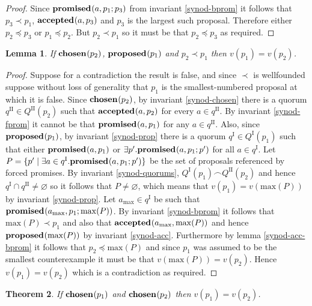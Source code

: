 \documentclass[journal]{IEEEtran}
\newtheorem{theorem}{Theorem}
\newtheorem{lemma}[theorem]{Lemma}
\begin{document}
\begin{proof}Since $\mathbf{promised}_{}(a,p_1;p_3)$ from invariant \ref{synod-bprom} it
follows that $p_3 \prec p_1$, $\mathbf{accepted}_{}(a,p_3)$ and $p_3$ is the largest such
proposal. Therefore either $p_2 \preceq p_3$ or $p_1 \preceq p_2$.  But $p_2
\prec p_1$ so it must be that $p_2 \preceq p_3$ as required.  \end{proof}

\begin{lemma}\label{synod-lemma} If $\mathbf{chosen}_{}(p_2)$, $\mathbf{proposed}_{}(p_1)$ and $p_2
\prec p_1$ then $v(p_1) = v(p_2)$. \end{lemma}

\begin{proof}Suppose for a contradiction the result is false, and since $\prec$
is wellfounded suppose without loss of generality that $p_1$ is the
smallest-numbered proposal at which it is false.  Since $\mathbf{chosen}_{}(p_2)$, by
invariant \ref{synod-chosen} there is a quorum $q^\textrm{II} \in
Q^\textrm{II}(p_2)$ such that $\mathbf{accepted}_{}(a,p_2)$ for every $a \in q^\textrm{II}$.
By invariant \ref{synod-fprom} it cannot be that $\mathbf{promised}_{}(a,p_1)$ for any $a
\in q^\textrm{II}$.  Also, since $\mathbf{proposed}_{}(p_1)$, by invariant \ref{synod-prop}
there is a quorum $q^\textrm{I} \in Q^\textrm{I}(p_1)$ such that either
$\mathbf{promised}_{}(a,p_1)$ or $\exists p'.  \mathbf{promised}_{}(a,p_1;p')$ for all $a \in
q^\textrm{I}$.  Let $P = \{ p' \mid \exists a \in q^\textrm{I}.
\mathbf{promised}_{}(a,p_1;p') \}$ be the set of proposals referenced by forced promises.
By invariant \ref{synod-quorums}, ${Q^\textrm{I}(p_1) \frown
Q^\textrm{II}(p_2)}$ and hence $q^\textrm{I} \cap q^\textrm{II} \ne
\varnothing$ so it follows that $P \ne \varnothing$, which means that $v(p_1) =
v(\mathrm{max}(P))$ by invariant \ref{synod-prop}. Let $a_{\mathrm{max}} \in
q^\textrm{I}$ be such that $\mathbf{promised}_{}(a_{\mathrm{max}},p_1;\mathrm{max}(P))$.
By invariant \ref{synod-bprom} it follows that $\mathrm{max}(P) \prec p_1$ and
also that $\mathbf{accepted}_{}(a_{\mathrm{max}},\mathrm{max}(P))$ and hence
$\mathbf{proposed}_{}(\mathrm{max}(P))$ by invariant \ref{synod-acc}. Furthermore by lemma
\ref{synod-acc-bprom} it follows that $p_2 \preceq \mathrm{max}(P)$ and since
$p_1$ was assumed to be the smallest counterexample it must be that
$v(\mathrm{max}(P)) = v(p_2)$.  Hence $v(p_1) = v(p_2)$ which is a
contradiction as required.  \end{proof}

\begin{theorem}\label{synod-safety-theorem} If $\mathbf{chosen}_{}(p_1)$ and
$\mathbf{chosen}_{}(p_2)$ then $v(p_1) = v(p_2)$.  \end{theorem}
\end{document}
